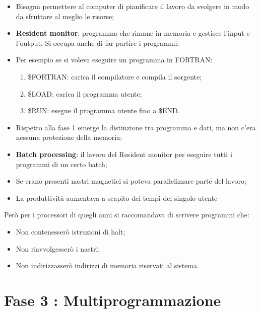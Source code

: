 \begin{itemize}
    \item Bisogna permettere al computer di pianificare 
    il lavoro da svolgere in modo da sfruttare al meglio le risorse;
    \item \textbf{Resident monitor}: programma che rimane in memoria 
    e gestisce l'input e l'output. Si occupa anche di far partire i programmi;
    \item Per esempio se si voleva eseguire un programma in FORTRAN:
    \begin{enumerate}
        \item \$FORTRAN: carica il compilatore e compila il sorgente;
        \item \$LOAD: carica il programma utente;
        \item \$RUN: esegue il programma utente fino a \$END.
    \end{enumerate}
    \item Rispetto alla fase 1 emerge la distinzione tra programma e
    dati, ma non c'era nessuna protezione della memoria;
    \item \textbf{Batch processing}: il lavoro del Resident monitor per 
    eseguire tutti i programmi di un certo batch;
    \item Se erano presenti nastri magnetici si poteva parallelizzare
    parte del lavoro;
    \item La produttività aumentava a scapito dei tempi del singolo
    utente
\end{itemize}


Però per i processori di quegli anni si raccomandava di scrivere programmi che:
\begin{itemize}
    \item Non contenesserò istruzioni di halt;
    \item Non riavvolgesserò i nastri;
    \item Non indirizzasserò indirizzi di memoria riservati al sistema.
\end{itemize}

\section{Fase 3 : Multiprogrammazione}

